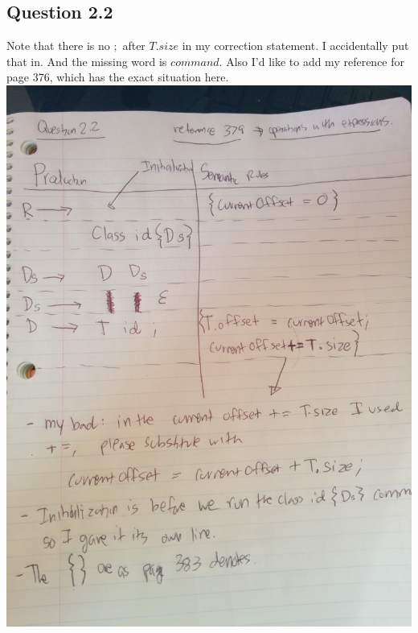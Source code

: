 \documentclass[11pt, oneside]{article}   	%
\begin{document}
\subsection*{Question 2.2}
\par Note that there is no $;$ after $T.size$ in my correction statement. I accidentally put that in. And the missing word is $command$. Also I'd like to add my reference for page 376, which has the exact situation here.
\\
\includegraphics[scale=0.15]{IMG_20141011_154642.jpg}

\newpage
\end{document}
